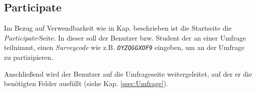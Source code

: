 \subsection{Participate}
Im Bezug auf Verwendbarkeit wie in Kap.  beschrieben ist die Startseite die \emph{Participate}-Seite. 
In dieser soll der Benutzer bzw. Student der an einer Umfrage teilnimmt, einen \emph{Surveycode} wie z.B. \emph{\texttt{OYZQGGXOF9}} eingeben, um an der Umfrage zu partizipieren. 

Anschließend wird der Benutzer auf die Umfrageseite weitergeleitet, auf der er die benötigten Felder ausfüllt (siehe Kap. \vref{ssec:Umfrage}).